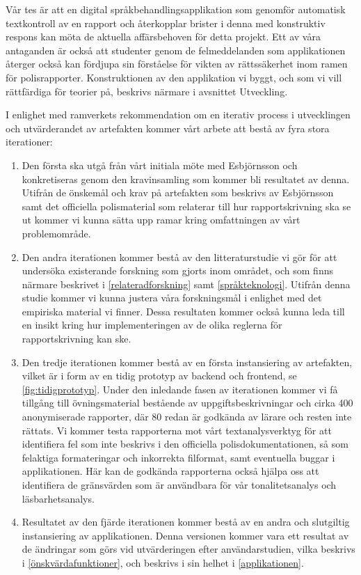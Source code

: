 \documentclass[swedish]{maucsthesis}
\begin{document}
Vår tes är att en digital språkbehandlingsapplikation som genomför automatisk
textkontroll av en rapport och återkopplar brister i denna med konstruktiv
respons kan möta de aktuella affärsbehoven för detta projekt. Ett av våra
antaganden är också att studenter genom de felmeddelanden som applikationen
återger också kan fördjupa sin förståelse för vikten av rättssäkerhet inom ramen
för polisrapporter. Konstruktionen av den applikation vi byggt, och som vi vill rättfärdiga för teorier på, beskrivs närmare i avsnittet Utveckling.

I enlighet med ramverkets rekommendation om en iterativ process i utvecklingen och utvärderandet av artefakten kommer vårt arbete att bestå av fyra stora iterationer:

\begin{enumerate}
\item Den första ska utgå från vårt initiala möte med Esbjörnsson och konkretiseras genom den kravinsamling som kommer bli resultatet av denna.
  Utifrån de önskemål och krav på artefakten som beskrivs av Esbjörnsson samt det
  officiella polismaterial som relaterar till hur rapportskrivning ska se ut
  kommer vi kunna sätta upp ramar kring omfattningen av vårt problemområde.
\item Den andra iterationen kommer bestå av den litteraturstudie vi gör för att undersöka existerande forskning som gjorts inom området, och som finns
  närmare beskrivet i \cref{relateradforskning} samt \cref{språkteknologi}.
  Utifrån denna studie kommer vi kunna justera våra forskningsmål i enlighet med det
  empiriska material vi finner. Dessa resultaten kommer också kunna leda till en insikt kring
  hur implementeringen av de olika reglerna för rapportskrivning kan ske.
\item Den tredje iterationen kommer bestå av en första instansiering av artefakten, vilket är i form av en tidig prototyp av backend och frontend, se
  \cref{fig:tidigprototyp}. Under den inledande fasen av iterationen kommer vi få tillgång till övningsmaterial bestående av uppgiftsbeskrivningar och cirka
  400 anonymiserade rapporter, där 80 redan är godkända av lärare och resten inte rättats. Vi kommer testa rapporterna mot vårt textanalysverktyg för
  att identifiera fel som inte beskrivs i den officiella polisdokumentationen,
  så som felaktiga formateringar och inkorrekta filformat, samt eventuella
  buggar i applikationen. Här kan de godkända rapporterna också hjälpa oss att
  identifiera de gränsvärden som är användbara för vår tonalitetsanalys och
  läsbarhetsanalys.
\item Resultatet av den fjärde iterationen kommer bestå av en andra och slutgiltig
  instansiering av applikationen. Denna versionen kommer vara ett resultat av de
  ändringar som görs vid utvärderingen efter användarstudien, vilka beskrivs i
  \cref{önskvärdafunktioner}, och beskrivs i sin helhet i
  \cref{applikationen}.
\end{enumerate}
\end{document}
